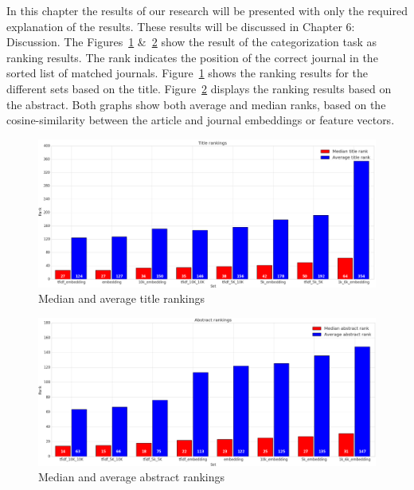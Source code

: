 \documentclass[../../Thesis.tex]{subfiles}
\begin{document}
In this chapter the results of our research will be presented with only the required explanation of the results. These results will be discussed in Chapter 6: Discussion.
The Figures~\ref{figure:titleRanks} \&~\ref{figure:abstractRanks} show the result of the categorization task as ranking results. The rank indicates the position of the correct journal in the sorted list of matched journals. Figure~\ref{figure:titleRanks} shows the ranking results for the different sets based on the title. Figure~\ref{figure:abstractRanks} displays the ranking results based on the abstract. Both graphs show both average and median ranks, based on the cosine-similarity between the article and journal embeddings or feature vectors.
\clearpage
\begin{figure}[hbt]
\includegraphics[width=6.5in]{Plots/Title_rankings}
\caption{Median and average title rankings}\label{figure:titleRanks}
\end{figure}
\begin{figure}[hbt]
\includegraphics[width=6.5in]{Plots/Abstract_rankings}
\caption{Median and average abstract rankings}\label{figure:abstractRanks}
\end{figure}
\clearpage
{}
\end{document}
